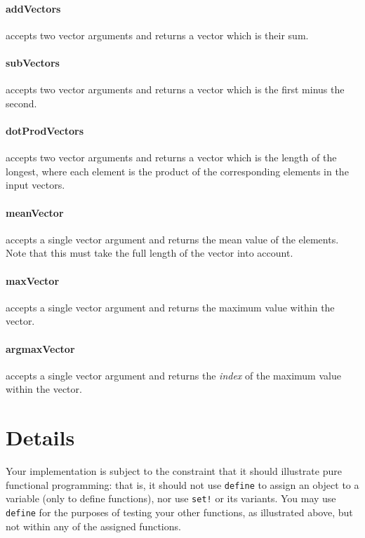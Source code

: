 \documentclass[12pt,info]{asg}
\begin{document}
\paragraph{addVectors} accepts two vector arguments and returns a vector which is their sum.

\paragraph{subVectors} accepts two vector arguments and returns a vector which is the first minus the second.

\paragraph{dotProdVectors} accepts two vector arguments and returns a vector which is the length of the longest, where each element is the product of the corresponding elements in the input vectors.

\paragraph{meanVector} accepts a single vector argument and returns the mean value of the elements. Note that this must take the full length of the vector into account.

\paragraph{maxVector} accepts a single vector argument and returns the maximum value within the vector.

\paragraph{argmaxVector} accepts a single vector argument and returns the {\em index} 
of the maximum value within the vector. 

\section*{Details}
Your implementation is subject to the constraint that it should illustrate pure functional programming: that is, it should not use \texttt{define} to assign an object to a variable (only to define functions), nor use \texttt{set!} or its variants. You may use \texttt{define} for the purposes of testing your other functions, as illustrated above, but not within any of the assigned functions. 
\end{document}
